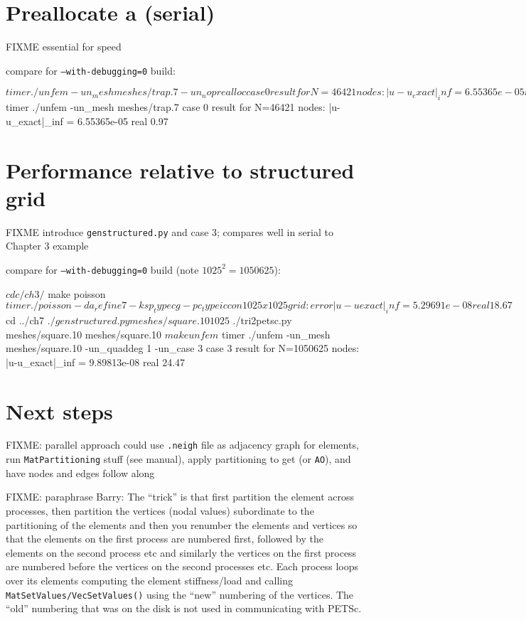 

\section{Preallocate a \pMat (serial)}

FIXME essential for speed


compare for \texttt{--with-debugging=0} build:
\begin{cline}
$ timer ./unfem -un_mesh meshes/trap.7 -un_noprealloc
case 0 result for N=46421 nodes:  |u-u_exact|_inf = 6.55365e-05
real 56.30
$ timer ./unfem -un_mesh meshes/trap.7
case 0 result for N=46421 nodes:  |u-u_exact|_inf = 6.55365e-05
real 0.97
\end{cline}

\section{Performance relative to \pDMDA structured grid}

FIXME introduce \texttt{genstructured.py} and case 3; compares well in serial to Chapter 3 example

compare for \texttt{--with-debugging=0} build (note $1025^2=1050625$):
\begin{cline}
$ cd c/ch3/
$ make poisson
$ timer ./poisson -da_refine 7 -ksp_type cg -pc_type icc
on 1025 x 1025 grid:  error |u-uexact|_inf = 5.29691e-08
real 18.67
$ cd ../ch7
$ ./genstructured.py meshes/square.10 1025
$ ./tri2petsc.py meshes/square.10 meshes/square.10
$ make unfem
$ timer ./unfem -un_mesh meshes/square.10 -un_quaddeg 1 -un_case 3
case 3 result for N=1050625 nodes:  |u-u_exact|_inf = 9.89813e-08
real 24.47
\end{cline}

\section{Next steps}

FIXME: parallel approach could use \Triangle \texttt{.neigh} file as adjacency graph for elements, run \texttt{MatPartitioning} stuff (see manual), apply partitioning to get \pIS (or \texttt{AO}), and have nodes and edges follow along

FIXME: paraphrase Barry: The ``trick'' is that first partition the element across processes, then partition the vertices (nodal values) subordinate to the partitioning of the elements and then you renumber the elements and vertices so that the elements on the first process are numbered first, followed by the elements on the second process etc and similarly the vertices on the first process are numbered before the vertices on the second processes etc.  Each process loops over its elements computing the element stiffness/load and calling \texttt{MatSetValues/VecSetValues()} using the ``new'' numbering of the vertices.  The ``old'' numbering that was on the disk is not used in communicating with PETSc.

